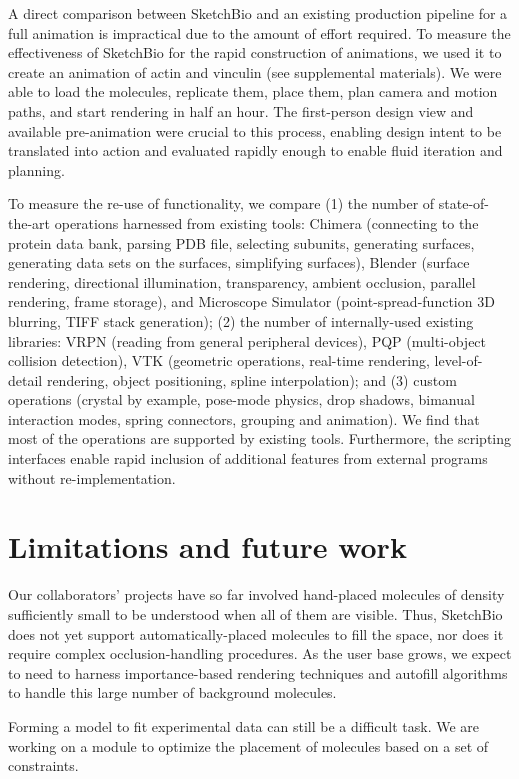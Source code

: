\documentclass[twocolumn]{bmcart}%
\begin{document}
A direct comparison between SketchBio and an existing production pipeline for a full animation is impractical due to the amount of effort required.
To measure the effectiveness of SketchBio for the rapid construction of animations, we used it to create an animation of actin and vinculin (see supplemental materials).
We were able to load the molecules, replicate them, place them, plan camera and motion paths, and start rendering in half an hour.
The first-person design view and available pre-animation were crucial to this process, enabling design intent to be translated into action and evaluated rapidly enough to enable fluid iteration and planning.

To measure the re-use of functionality, we compare (1) the number of state-of-the-art operations harnessed from existing tools: Chimera (connecting to the protein data bank, parsing PDB file, selecting subunits, generating surfaces, generating data sets on the surfaces, simplifying surfaces), Blender (surface rendering, directional illumination, transparency, ambient occlusion, parallel rendering, frame storage), and Microscope Simulator (point-spread-function 3D blurring, TIFF stack generation); (2) the number of internally-used existing libraries: VRPN (reading from general peripheral devices), PQP (multi-object collision detection), VTK (geometric operations, real-time rendering, level-of-detail rendering, object positioning, spline interpolation); and (3) custom operations (crystal by example, pose-mode physics, drop shadows, bimanual interaction modes, spring connectors, grouping and animation).  We find that most of the operations are supported by existing tools.
Furthermore, the scripting interfaces enable rapid inclusion of additional features from external programs without re-implementation.


\section*{Limitations and future work}
Our collaborators' projects have so far involved hand-placed molecules of density sufficiently small to be understood when all of them are visible.
Thus, SketchBio does not yet support automatically-placed molecules to fill the space, nor does it require complex occlusion-handling procedures.
As the user base grows, we expect to need to harness importance-based rendering techniques and autofill algorithms to handle this large number of background molecules.

Forming a model to fit experimental data can still be a difficult task.  We are working on a module to optimize the placement of molecules based on a set of constraints.
\end{document}
